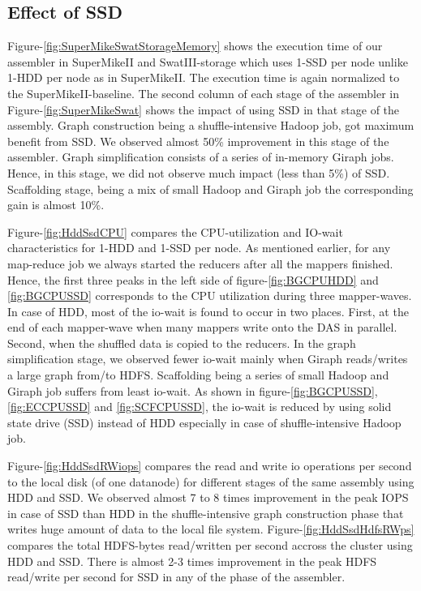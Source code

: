 \documentclass[conference]{IEEEtran}
\begin{document}
\subsection {Effect of SSD} \label{EffectOfSSD}
Figure-\ref{fig:SuperMikeSwatStorageMemory} shows the execution time of our assembler in SuperMikeII and SwatIII-storage which uses 1-SSD per node unlike 1-HDD per node as in SuperMikeII.
The execution time is again normalized to the SuperMikeII-baseline.
The second column of each stage of the assembler in Figure-\ref{fig:SuperMikeSwat} shows the impact of using SSD in that stage of the assembly.
Graph construction being a shuffle-intensive Hadoop job, got maximum benefit from SSD. We observed almost 50\% improvement in this stage of the assembler. Graph simplification consists of a series of in-memory Giraph jobs. Hence, in this stage, we did not observe much impact (less than 5\%) of SSD. Scaffolding stage, being a mix of small Hadoop and Giraph job the corresponding gain is almost 10\%.

Figure-\ref{fig:HddSsdCPU} compares the CPU-utilization and IO-wait characteristics for 1-HDD and 1-SSD per node.
As mentioned earlier, for any map-reduce job we always started the reducers after all the mappers finished. 
Hence, the first three peaks in the left side of figure-\ref{fig:BGCPUHDD} and \ref{fig:BGCPUSSD} corresponds to the CPU utilization during three mapper-waves. 
In case of HDD, most of the io-wait is found to occur in two places. First, at the end of each mapper-wave when many mappers write onto the DAS in parallel. Second, when the shuffled data is copied to the reducers.
In the graph simplification stage, we observed fewer io-wait mainly when Giraph reads/writes a large graph from/to HDFS.
Scaffolding being a series of small Hadoop and Giraph job suffers from least io-wait. 
As shown in figure-\ref{fig:BGCPUSSD}, \ref{fig:ECCPUSSD} and \ref{fig:SCFCPUSSD}, the io-wait is reduced by using solid state drive (SSD) instead of HDD especially in case of shuffle-intensive Hadoop job. 

Figure-\ref{fig:HddSsdRWiops} compares the read and write io operations per second to the local disk (of one datanode) for different stages of the same assembly using HDD and SSD.
We observed almost 7 to 8 times improvement in the peak IOPS in case of SSD than HDD in the shuffle-intensive graph construction phase that writes huge amount of data to the local file system.
Figure-\ref{fig:HddSsdHdfsRWps} compares the total HDFS-bytes read/written per second accross the cluster using HDD and SSD. 
There is almost 2-3 times improvement in the peak HDFS read/write per second for SSD in any of the phase of the assembler.
\end{document}
